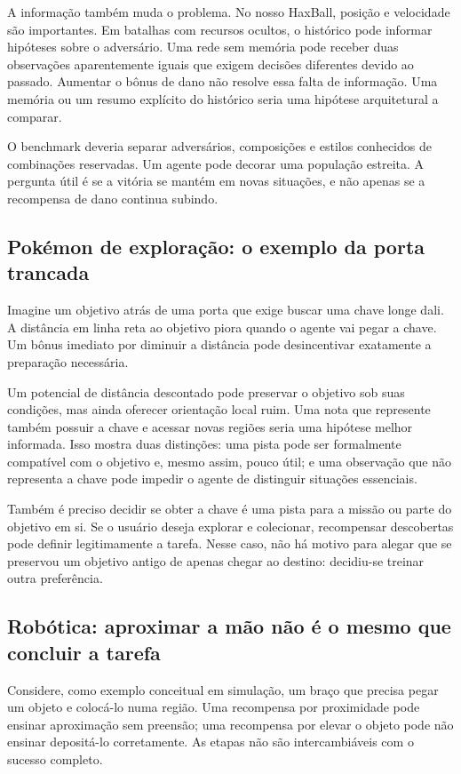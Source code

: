 \documentclass[11pt,a4paper]{article}
\begin{document}
A informação também muda o problema. No nosso HaxBall, posição e velocidade são importantes. Em batalhas com recursos ocultos, o histórico pode informar hipóteses sobre o adversário. Uma rede sem memória pode receber duas observações aparentemente iguais que exigem decisões diferentes devido ao passado. Aumentar o bônus de dano não resolve essa falta de informação. Uma memória ou um resumo explícito do histórico seria uma hipótese arquitetural a comparar.

O benchmark deveria separar adversários, composições e estilos conhecidos de combinações reservadas. Um agente pode decorar uma população estreita. A pergunta útil é se a vitória se mantém em novas situações, e não apenas se a recompensa de dano continua subindo.

\subsection{Pokémon de exploração: o exemplo da porta trancada}
Imagine um objetivo atrás de uma porta que exige buscar uma chave longe dali. A distância em linha reta ao objetivo piora quando o agente vai pegar a chave. Um bônus imediato por diminuir a distância pode desincentivar exatamente a preparação necessária.

Um potencial de distância descontado pode preservar o objetivo sob suas condições, mas ainda oferecer orientação local ruim. Uma nota que represente também possuir a chave e acessar novas regiões seria uma hipótese melhor informada. Isso mostra duas distinções: uma pista pode ser formalmente compatível com o objetivo e, mesmo assim, pouco útil; e uma observação que não representa a chave pode impedir o agente de distinguir situações essenciais.

Também é preciso decidir se obter a chave é uma pista para a missão ou parte do objetivo em si. Se o usuário deseja explorar e colecionar, recompensar descobertas pode definir legitimamente a tarefa. Nesse caso, não há motivo para alegar que se preservou um objetivo antigo de apenas chegar ao destino: decidiu-se treinar outra preferência.

\subsection{Robótica: aproximar a mão não é o mesmo que concluir a tarefa}
Considere, como exemplo conceitual em simulação, um braço que precisa pegar um objeto e colocá-lo numa região. Uma recompensa por proximidade pode ensinar aproximação sem preensão; uma recompensa por elevar o objeto pode não ensinar depositá-lo corretamente. As etapas não são intercambiáveis com o sucesso completo.
\end{document}
